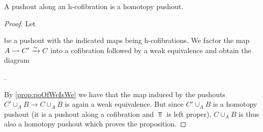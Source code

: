\begin{corollary}\label{prop:poAlongHCofibIsHtpyPo}
    A pushout along an h-cofibration is a homotopy pushout.
    \begin{proof}
        Let
        \begin{center}
        \end{center}
        be a pushout with the indicated maps being h-cofibrations.
        We factor the map $A\xtailrightarrow{} C'\xrightarrow{\sim} C$ into a cofibration followed by a weak equivalence and obtain the diagram
        \begin{center}
            \;.
        \end{center}
        By \cref{prop:poOfWeIsWe} we have that the map induced by the pushouts $C'\cup_AB\to C\cup_AB$ is again a weak equivalence.
        But since $C'\cup_AB$ is a homotopy pushout (it is a pushout along a cofibration and $\Top$ is left proper), $C\cup_AB$ is thus also a homotopy pushout which proves the proposition.
    \end{proof}
\end{corollary}
